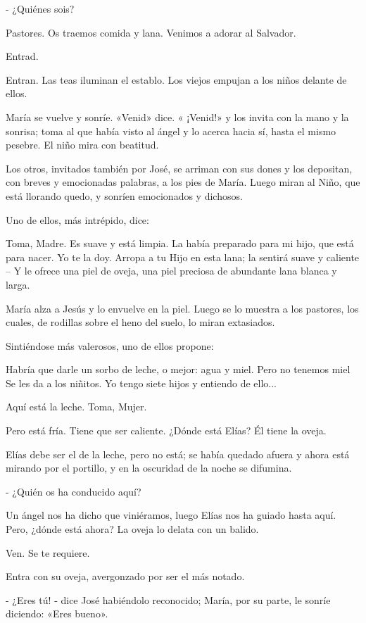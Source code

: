 \documentclass[12pt, twoside, openright]{book} %
\begin{document}
- ¿Quiénes sois? 

Pastores. Os traemos comida y lana. Venimos a adorar al Salvador. 

Entrad. 

Entran. Las teas iluminan el establo. Los viejos empujan a los niños delante de ellos. 

María se vuelve y sonríe. «Venid» dice. « ¡Venid!» y los invita con la mano y la sonrisa; toma al que había visto al ángel y lo acerca hacia sí, hasta el mismo pesebre. El niño mira con beatitud. 

Los otros, invitados también por José, se arriman con sus dones y los depositan, con breves y emocionadas palabras, a los pies de María. Luego miran al Niño, que está llorando quedo, y sonríen emocionados y dichosos. 

Uno de ellos, más intrépido, dice: 

Toma, Madre. Es suave y está limpia. La había preparado para mi hijo, que está para nacer. Yo te la doy. Arropa a tu Hijo en esta lana; la sentirá suave y caliente – Y le ofrece una piel de oveja, una piel preciosa de abundante lana blanca y larga. 

María alza a Jesús y lo envuelve en la piel. Luego se lo muestra a los pastores, los cuales, de rodillas sobre el heno del suelo, lo miran extasiados. 

Sintiéndose más valerosos, uno de ellos propone: 

Habría que darle un sorbo de leche, o mejor: agua y miel. Pero no tenemos miel Se les da a los niñitos. Yo tengo siete hijos y entiendo de ello... 

Aquí está la leche. Toma, Mujer. 

Pero está fría. Tiene que ser caliente. ¿Dónde está Elías? Él tiene la oveja. 

Elías debe ser el de la leche, pero no está; se había quedado afuera y ahora está mirando por el portillo, y en la oscuridad de la noche se difumina. 

- ¿Quién os ha conducido aquí? 

Un ángel nos ha dicho que viniéramos, luego Elías nos ha guiado hasta aquí. Pero, ¿dónde está ahora? La oveja lo delata con un balido. 

Ven. Se te requiere. 

Entra con su oveja, avergonzado por ser el más notado. 

- ¿Eres tú! - dice José habiéndolo reconocido; María, por su parte, le sonríe diciendo: «Eres bueno». 
\end{document}
